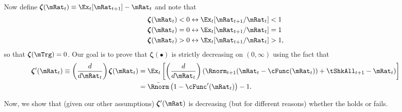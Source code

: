 \documentclass[\econtexRoot/BufferStockTheory]{subfiles}
\begin{document}
Now define \providecommand{\difFunc}{\pmb{\zeta}} $\difFunc(\mRat_t) \equiv 
\Ex_t[\mRat_{t+1}] - \mRat_t$ and note that
\begin{equation}\begin{gathered}\begin{aligned}\label{eq:difRatioEquiv}
  \difFunc(\mRat_t) < 0 &\leftrightarrow \Ex_t[{\mRat}_{t+1}/\mRat_t] < 1 
                          \nonumber\\
  \difFunc(\mRat_t) = 0 &\leftrightarrow \Ex_t[{\mRat}_{t+1}/\mRat_t] = 1\\
  \difFunc(\mRat_t) > 0 &\leftrightarrow \Ex_t[{\mRat}_{t+1}/\mRat_t] > 
                          1,\nonumber
\end{aligned}\end{gathered}\end{equation}
so that $\difFunc(\mTrg)=0$. Our goal is to prove that $\difFunc(\bullet)$ is strictly 
decreasing on $(0,\infty)$ using the fact that
\begin{equation}\begin{gathered}\begin{aligned}
  \difFunc^{\prime}(\mRat_{t}) \equiv  \left( \frac{d}{d\mRat_{t}}\right) \difFunc(\mRat_t)  & = \Ex_{t}\left[
                                                                                               \left( \frac{d}{d\mRat_{t}}\right) \left( 
                                                                                               {\Rnorm}_{t+1}(\mRat_{t}-\cFunc(\mRat_{t}))+%
                                                                                               {\tShkAll}_{t+1} - {\mRat}_t\right) \right] \label{eq:difFuncmRatDecreases} \\
                                                                                             & = \bar{\Rnorm}\left(1-\cFunc^{\prime}({\mRat}_t)\right) - 1.  \notag
\end{aligned}\end{gathered}\end{equation}

Now, we show that (given our other assumptions) $\difFunc^{\prime}(\mRat)$ is decreasing (but for different reasons) whether the {\RIC} holds or fails.
\end{document}
